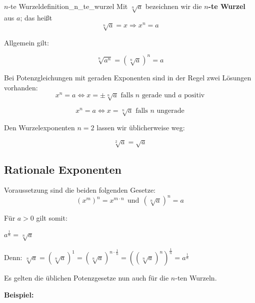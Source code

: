 \newpage
\begin{definition}{$n$-te Wurzel}{definition_n_te_wurzel}
Mit $\sqrt[n]{a}$ bezeichnen wir die $n$\textbf{-te Wurzel} aus $a$; das heißt
$$\sqrt[n]{a} = x \Rightarrow x^n = a$$
\end{definition}


Allgemein gilt:

$$\sqrt[n]{a^n} = \left(\sqrt[n]a\right)^n = a$$

\begin{bemerkung}{}{}
Bei Potenzgleichungen mit geraden Exponenten sind in der Regel zwei Lösungen vorhanden:
$$x^n = a \Leftrightarrow x = \pm \sqrt[n]{a} \textrm{ falls } n \textrm{ gerade und } a \textrm{ positiv}$$

$$x^n = a \Leftrightarrow x = \sqrt[n]{a} \textrm{ falls } n \textrm{ ungerade}$$
\end{bemerkung}

\begin{bemerkung}{}{}
Den Wurzelexponenten $n=2$ lassen wir üblicherweise weg:

$$\sqrt[2]{a} = \sqrt{a}$$
\end{bemerkung}
\newpage


\subsection{Rationale Exponenten}

Voraussetzung sind die beiden folgenden Gesetze:
$$(x^m)^n = x^{m\cdot n}\ \ \textrm{und}\ \ \left(\sqrt[n]{a}\right)^n = a$$

Für $a > 0$ gilt somit:

\begin{gesetz}{}{}
\begin{center}
  $a^{\frac{1}{n}} = \sqrt[n]{a}$
\end{center}
\end{gesetz}


Denn: $\sqrt[n]{a} = \left(\sqrt[n]{a}\right)^1 =
\left(\sqrt[n]{a}\right)^{n\cdot{}\frac{1}{n}} =
\left(\left(\sqrt[n]{a}\right)^n\right)^\frac{1}{n} = a^\frac{1}{n}$



Es gelten die üblichen Potenzgesetze nun auch für die $n$-ten
Wurzeln.


\textbf{Beispiel:}
\begin{center}
\end{center}


